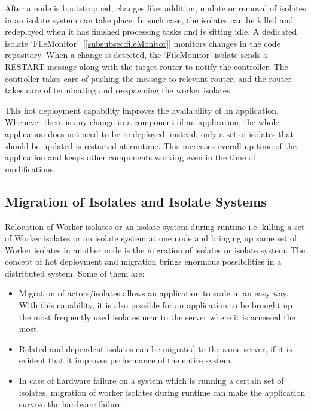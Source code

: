   After a node is bootstrapped, changes like: addition, update or removal of isolates in an isolate system can take place. In such case, the isolates can be killed and redeployed when it has finished processing tasks and is sitting idle. A dedicated isolate ‘FileMonitor’~[\autoref{subsubsec:fileMonitor}] monitors changes in the code repository. When a change is detected, the ‘FileMonitor’ isolate sends a RESTART message along with the target router to notify the controller. The controller takes care of pushing the message to relevant router, and the router takes care of terminating and re-spawning the worker isolates.

  This hot deployment capability improves the availability of an application. Whenever there is any change in a component of an application, the whole application does not need to be re-deployed, instead, only a set of isolates that should be updated is restarted at runtime. This increases overall up-time of the application and keeps other components working even in the time of modifications.

\subsection{Migration of Isolates and Isolate Systems}
  Relocation of Worker isolates or an isolate system during runtime i.e. killing a set of Worker isolates or an isolate system at one node and bringing up same set of Worker isolates in another node is the migration of isolates or isolate system. The concept of hot deployment and migration brings enormous possibilities in a distributed system. Some of them are:

\begin{itemize}

  \item Migration of actors/isolates allows an application to scale in an easy way. With this capability, it is also possible for an application to be brought up the most frequently used isolates near to the server where it is accessed the most.

  \item Related and dependent isolates can be migrated to the same server, if it is evident that it improves performance of the entire system.

  \item In case of hardware failure on a system which is running a certain set of isolates, migration of worker isolates during runtime can make the application survive the hardware failure.

\end{itemize}

